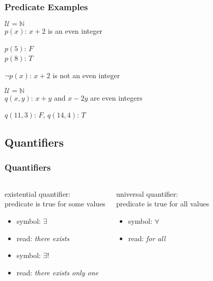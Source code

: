 \documentclass[dvipsnames]{beamer}
\begin{document}
\begin{frame}
  \frametitle{Predicate Examples}

  \begin{example}
    $\mathcal{U} = \mathbb{N}$\\
    $p(x)$: $x+2$ is an even integer

    \bigskip
    $p(5)$: $F$\\
    $p(8)$: $T$

    \pause
    \bigskip
    $\neg p(x)$: $x+2$ is not an even integer
  \end{example}

  \pause
  \begin{example}
    $\mathcal{U} = \mathbb{N}$\\
    $q(x,y)$: $x+y$ and $x-2y$ are even integers

    \bigskip
    $q(11,3)$: $F$, $q(14,4)$: $T$
  \end{example}
\end{frame}

\subsection{Quantifiers}

\begin{frame}
  \frametitle{Quantifiers}

  \begin{columns}[t]
    \begin{definition}
      \alert{existential quantifier}:\\
        predicate is true for some values

      \begin{itemize}
        \item symbol: $\exists$
        \item read: \emph{there exists}

        \pause
        \medskip
        \item symbol: $\exists!$
        \item read: \emph{there exists only one}
      \end{itemize}
    \end{definition}

    \pause
    \begin{definition}
      \alert{universal quantifier}:\\
        predicate is true for all values

      \begin{itemize}
        \item symbol: $\forall$
        \item read: \emph{for all}
      \end{itemize}
    \end{definition}
  \end{columns}
\end{frame}
\end{document}
